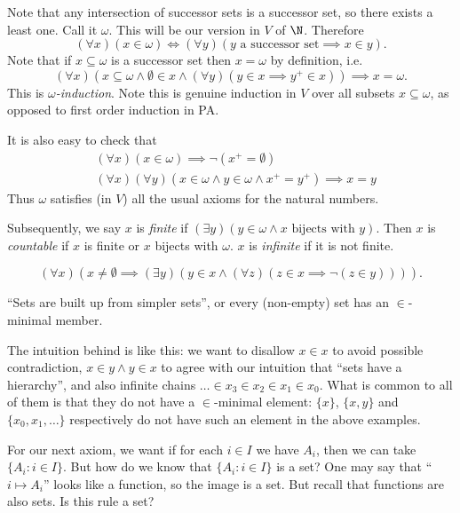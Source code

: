\documentclass[a4paper]{article}
\begin{document}
Note that any intersection of successor sets is a successor set, so there exists a least one. Call it \(\omega\). This will be our version in \(V\) of \(\N\). Therefore
\[
  (\forall x) (x \in \omega) \iff (\forall y) (y \text{ a successor set} \implies x \in y).
\]
Note that if \(x \subseteq \omega\) is a successor set then \(x = \omega\) by definition, i.e.
\[
  (\forall x) (x \subseteq \omega \land \emptyset \in x \land (\forall y) (y \in x \implies y^+ \in x)) \implies x = \omega.
\]
This is \emph{\(\omega\)-induction}. Note this is genuine induction in \(V\) over all subsets \(x \subseteq \omega\), as opposed to first order induction in PA.

It is also easy to check that
\begin{align*}
  & (\forall x) (x \in \omega) \implies \neg (x^+ = \emptyset) \\
  & (\forall x) (\forall y) (x \in \omega \land y \in \omega \land x^+ = y^+) \implies x = y
\end{align*}
Thus \(\omega\) satisfies (in \(V\)) all the usual axioms for the natural numbers.

Subsequently, we say \(x\) is \emph{finite} if \((\exists y) (y \in \omega \land x \text{ bijects with } y)\). Then \(x\) is \emph{countable} if \(x\) is finite or \(x\) bijects with \(\omega\). \(x\) is \emph{infinite} if it is not finite.

\begin{axiom*}
  \[
    (\forall x) (x \neq \emptyset \implies (\exists y) (y \in x \land (\forall z) (z \in x \implies \neg (z \in y)))).
  \]
\end{axiom*}
``Sets are built up from simpler sets'', or every (non-empty) set has an \(\in\)-minimal member.

The intuition behind is like this: we want to disallow \(x \in x\) to avoid possible contradiction, \(x \in y \land y \in x\) to agree with our intuition that ``sets have a hierarchy'', and also infinite chains \(\dots \in x_3 \in x_2 \in x_1 \in x_0\). What is common to all of them is that they do not have a \(\in\)-minimal element: \(\{x\}\), \(\{x, y\}\) and \(\{x_0, x_1, \dots\}\) respectively do not have such an element in the above examples.

For our next axiom, we want if for each \(i \in I\) we have \(A_i\), then we can take \(\{A_i: i \in I\}\). But how do we know that \(\{A_i: i \in I\}\) is a set? One may say that ``\(i \mapsto A_i\)'' looks like a function, so the image is a set. But recall that functions are also sets. Is this rule a set?
\end{document}
